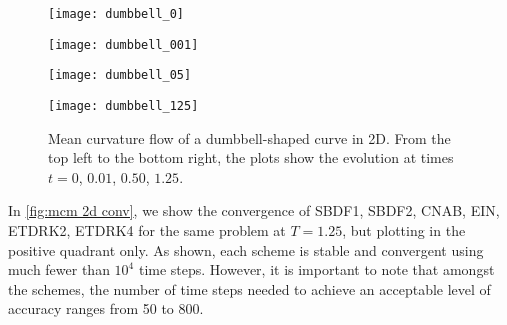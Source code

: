 \begin{figure}[htb!]
        \centering
\begin{minipage}{0.48\textwidth}
        \texttt{[image: dumbbell\_0]}
\end{minipage}%
\begin{minipage}{0.48\textwidth}
        \texttt{[image: dumbbell\_001]}
\end{minipage}
\begin{minipage}{0.48\textwidth}
        \texttt{[image: dumbbell\_05]}
\end{minipage}%
\begin{minipage}{0.48\textwidth}
        \texttt{[image: dumbbell\_125]}
\end{minipage}%
\caption[Mean curvature flow of a dumbbell-shaped curve in 2D]{Mean curvature flow of a dumbbell-shaped curve in 2D. From the top left to the bottom right, the plots show the evolution at times $t=0$, $0.01$, $0.50$, $1.25$.}
\label{fig:mcm 2d dumbbell}
\end{figure}

In \cref{fig:mcm 2d conv}, we show the convergence of SBDF1, SBDF2, CNAB, EIN, ETDRK2, ETDRK4 for the same problem at $T=1.25$, but plotting in the positive quadrant only. As shown, each scheme is stable and convergent using much fewer than $10^4$ time steps. However, it is important to note that amongst the schemes, the number of time steps needed to achieve an acceptable level of accuracy ranges from 50 to 800. 

